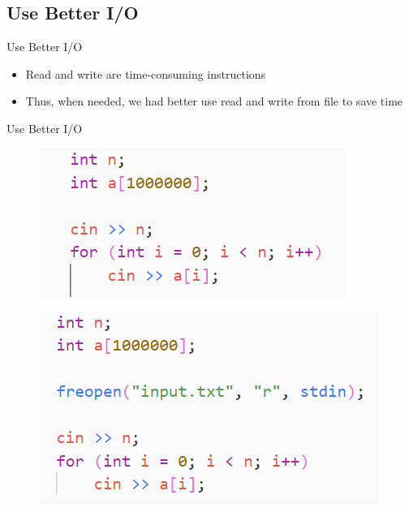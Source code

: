 \documentclass[aspectratio=169,xcolor=dvipsnames]{beamer}
\begin{document}
\subsection{Use Better I/O}
\begin{frame}{Use Better I/O}
    \begin{itemize}
        \item Read and write are time-consuming instructions
        \item Thus, when needed, we had better use read and write from file to save time
    \end{itemize}
\end{frame}
\begin{frame}{Use Better I/O}
    \begin{figure}
        \centering
        \includegraphics[scale = 0.9]{io_1.png}
        \label{fig:my_label}
    \end{figure}
    \begin{figure}
        \centering
        \includegraphics[scale = 0.9]{io_2.png}
        \label{fig:my_label}
    \end{figure}
\end{frame}
\end{document}
